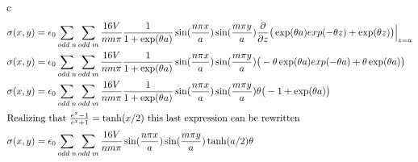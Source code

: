 \begin{homeworkProblem}
\begin{homeworkSection}{c}
\begin{align}
\sigma(x,y) &= \epsilon_0 \sum\limits_{odd\;n} \sum\limits_{odd\;m} \frac{16 V}{n m \pi} \frac{1}{1+\exp(\theta a)} \sin(\frac{n \pi x}{a}) \sin(\frac{m \pi y}{a}) \dfrac{\partial }{\partial z}\big(\exp(\theta a)exp(-\theta z) + \exp(\theta z)\big)\Big|_{z=a} \nonumber \\
\sigma(x,y) &= \epsilon_0 \sum\limits_{odd\;n} \sum\limits_{odd\;m} \frac{16 V}{n m \pi} \frac{1}{1+\exp(\theta a)} \sin(\frac{n \pi x}{a}) \sin(\frac{m \pi y}{a}) \big(-\theta \exp(\theta a)exp(-\theta a) + \theta \exp(\theta a)\big) \nonumber \\
\sigma(x,y) &= \epsilon_0 \sum\limits_{odd\;n} \sum\limits_{odd\;m} \frac{16 V}{n m \pi} \frac{1}{1+\exp(\theta a)} \sin(\frac{n \pi x}{a}) \sin(\frac{m \pi y}{a}) \theta\big(-1 + \exp(\theta a)\big) \nonumber \\
\intertext{Realizing that $\frac{e^x-1}{e^x+1} = \tanh(x/2)$ this last expression can be rewritten} \nonumber
\sigma(x,y) &= \epsilon_0 \sum\limits_{odd\;n} \sum\limits_{odd\;m} \frac{16 V}{n m \pi} \sin(\frac{n \pi x}{a}) \sin(\frac{m \pi y}{a})\tanh(a/2) \theta \nonumber
\end{align}
\end{homeworkSection}

\end{homeworkProblem}